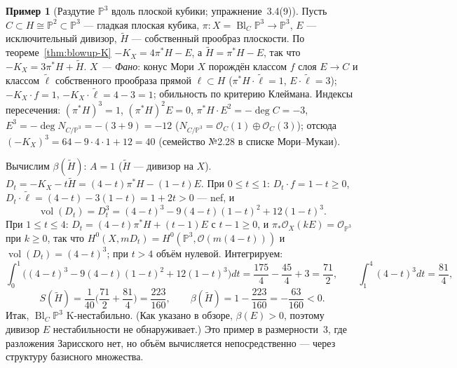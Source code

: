 \documentclass[11pt,a4paper]{article}
\theoremstyle{plain}
\theoremstyle{definition}
\newtheorem{example}[theorem]{Пример}
\theoremstyle{remark}
\newcommand{\PP}{\mathbb{P}}
\newcommand{\cO}{\mathcal{O}}
\DeclareMathOperator{\Bl}{Bl}
\DeclareMathOperator{\vol}{vol}
\begin{document}
\begin{example}[Раздутие $\PP^3$ вдоль плоской кубики; упражнение~3.4(9)]\label{ex:Bl-cubic-P3}
Пусть $C\subset H\cong\PP^2\subset\PP^3$ --- гладкая плоская кубика, $\pi\colon X=\Bl_C\PP^3\to\PP^3$,
$E$ --- исключительный дивизор, $\tilde H$ --- собственный прообраз плоскости. По
теореме~\ref{thm:blowup-K} $-K_X=4\pi^*H-E$, а $\tilde H=\pi^*H-E$, так что $-K_X=3\pi^*H+\tilde H$.
\emph{$X$ --- Фано}: конус Мори $X$ порождён классом $f$ слоя $E\to C$ и классом $\tilde\ell$
собственного прообраза прямой $\ell\subset H$ ($\pi^*H\cdot\tilde\ell=1$, $E\cdot\tilde\ell=3$);
$-K_X\cdot f=1$, $-K_X\cdot\tilde\ell=4-3=1$; обильность по критерию Клеймана. Индексы пересечения:
$(\pi^*H)^3=1$, $(\pi^*H)^2E=0$, $\pi^*H\cdot E^2=-\deg C=-3$, $E^3=-\deg N_{C/\PP^3}=-(3+9)=-12$
($N_{C/\PP^3}=\cO_C(1)\oplus\cO_C(3)$); отсюда $(-K_X)^3=64-9\cdot4\cdot1+12=40$ (семейство
№2.28 в списке Мори--Мукаи).

Вычислим $\beta(\tilde H)$: $A=1$ ($\tilde H$ --- дивизор на $X$). $D_t=-K_X-t\tilde H=(4-t)\pi^*H-(1-t)E$.
При $0\le t\le1$: $D_t\cdot f=1-t\ge0$, $D_t\cdot\tilde\ell=(4-t)-3(1-t)=1+2t>0$ --- nef, и
\[
\vol(D_t)=D_t^3=(4-t)^3-9(4-t)(1-t)^2+12(1-t)^3 .
\]
При $1\le t\le4$: $D_t=(4-t)\pi^*H+(t-1)E$ с $t-1\ge0$, и $\pi_*\cO_X(kE)=\cO_{\PP^3}$ при $k\ge0$,
так что $H^0(X,mD_t)=H^0(\PP^3,\cO(m(4-t)))$ и $\vol(D_t)=(4-t)^3$; при $t>4$ объём нулевой.
Интегрируем:
\[
\int_0^1\!\big((4-t)^3-9(4-t)(1-t)^2+12(1-t)^3\big)dt=\frac{175}4-\frac{45}4+3=\frac{71}2,\qquad
\int_1^4(4-t)^3dt=\frac{81}4,
\]
\[
S(\tilde H)=\frac1{40}\Big(\frac{71}2+\frac{81}4\Big)=\frac{223}{160},\qquad
\beta(\tilde H)=1-\frac{223}{160}=-\frac{63}{160}<0 .
\]
Итак, $\Bl_C\PP^3$ K-нестабильно. (Как указано в обзоре, $\beta(E)>0$, поэтому дивизор $E$
нестабильности не обнаруживает.) Это пример в размерности~3, где разложения Зарисского нет, но объём
вычисляется непосредственно --- через структуру базисного множества.
\end{example}
\end{document}
